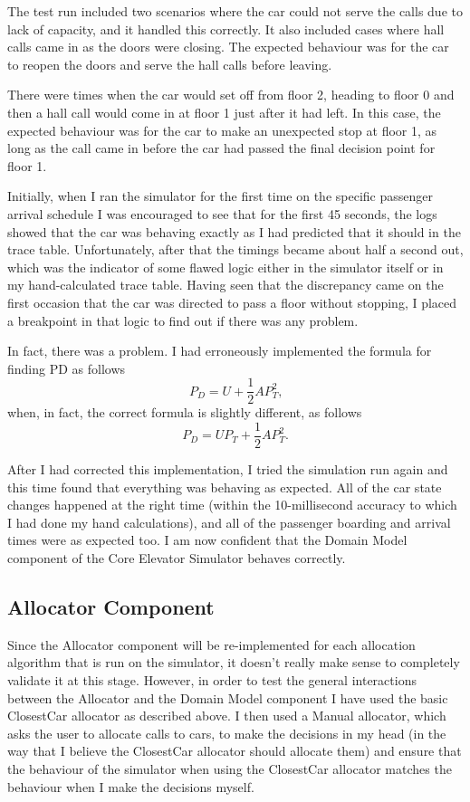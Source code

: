 \documentclass{UoYCSproject}
\begin{document}
The test run included two scenarios where the car could not serve the calls due to lack of capacity, and it handled this correctly.  It also included cases where hall calls came in as the doors were closing.  The expected behaviour was for the car to reopen the doors and serve the hall calls before leaving.

There were times when the car would set off from floor 2, heading to floor 0 and then a hall call would come in at floor 1 just after it had left.  In this case, the expected behaviour was for the car to make an unexpected stop at floor 1, as long as the call came in before the car had passed the final decision point for floor 1.

Initially, when I ran the simulator for the first time on the specific passenger arrival schedule I was encouraged to see that for the first 45 seconds, the logs showed that the car was behaving exactly as I had predicted that it should in the trace table.  Unfortunately, after that the timings became about half a second out, which was the indicator of some flawed logic either in the simulator itself or in my hand-calculated trace table.  Having seen that the discrepancy came on the first occasion that the car was directed to pass a floor without stopping, I placed a breakpoint in that logic to find out if there was any problem.

In fact, there was a problem.  I had erroneously implemented the formula for finding PD as follows
\[ P_D = U + \frac{1}{2}AP_T^2 \text{,} \]
when, in fact, the correct formula is slightly different, as follows
\[ P_D = UP_T + \frac{1}{2}AP_T^2 \text{.} \]

After I had corrected this implementation, I tried the simulation run again and this time found that everything was behaving as expected.  All of the car state changes happened at the right time (within the 10-millisecond accuracy to which I had done my hand calculations), and all of the passenger boarding and arrival times were as expected too.  I am now confident that the Domain Model component of the Core Elevator Simulator behaves correctly.

\subsection{Allocator Component}

Since the Allocator component will be re-implemented for each allocation algorithm that is run on the simulator, it doesn't really make sense to completely validate it at this stage.  However, in order to test the general interactions between the Allocator and the Domain Model component I have used the basic ClosestCar allocator as described above.  I then used a Manual allocator, which asks the user to allocate calls to cars, to make the decisions in my head (in the way that I believe the ClosestCar allocator should allocate them) and ensure that the behaviour of the simulator when using the ClosestCar allocator matches the behaviour when I make the decisions myself.
\end{document}
